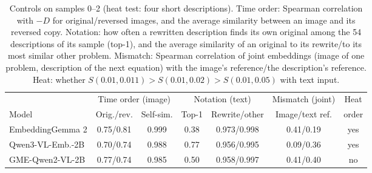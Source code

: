 \begin{table}[t]
\centering
\caption{Controls on samples 0--2 (heat test: four short descriptions). Time order: Spearman correlation with $-D$ for original/reversed images, and the average similarity between an image and its reversed copy. Notation: how often a rewritten description finds its own original among the 54 descriptions of its sample (top-1), and the average similarity of an original to its rewrite/to its most similar other problem. Mismatch: Spearman correlation of joint embeddings (image of one problem, description of the next equation) with the image's reference/the description's reference. Heat: whether $S(0.01,0.011)>S(0.01,0.02)>S(0.01,0.05)$ with text input.}
\label{tab:controls}
\small
\begin{tabular}{lcccccc}
\toprule
& \multicolumn{2}{c}{Time order (image)} & \multicolumn{2}{c}{Notation (text)} & Mismatch (joint) & Heat \\
\cmidrule(lr){2-3}\cmidrule(lr){4-5}
Model & Orig./rev. & Self-sim. & Top-1 & Rewrite/other & Image/text ref. & order \\
\midrule
EmbeddingGemma 2 & 0.75/0.81 & 0.999 & 0.38 & 0.973/0.998 & 0.41/0.19 & yes \\
Qwen3-VL-Emb.-2B & 0.70/0.74 & 0.988 & 0.77 & 0.956/0.995 & 0.09/0.36 & yes \\
GME-Qwen2-VL-2B & 0.77/0.74 & 0.985 & 0.50 & 0.958/0.997 & 0.41/0.40 & no \\
\bottomrule
\end{tabular}
\end{table}
